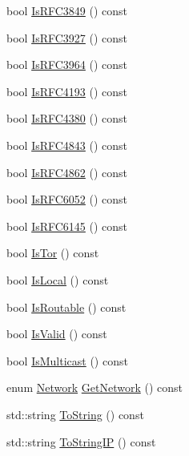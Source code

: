 \begin{DoxyCompactItemize}
\item 
bool \mbox{\hyperlink{class_c_net_addr_a7bf8bc283323c0cd9be42f921469c90f}{Is\+R\+F\+C3849}} () const
\item 
bool \mbox{\hyperlink{class_c_net_addr_af75408b0ae05d1e7d3931b80b65a70c4}{Is\+R\+F\+C3927}} () const
\item 
bool \mbox{\hyperlink{class_c_net_addr_ae0fcf758a607567f06cb966426289cd6}{Is\+R\+F\+C3964}} () const
\item 
bool \mbox{\hyperlink{class_c_net_addr_ac2eb12a3f11d9f54fa7c5072bf065d1c}{Is\+R\+F\+C4193}} () const
\item 
bool \mbox{\hyperlink{class_c_net_addr_aec91b10228b37eb9bd67dec322730492}{Is\+R\+F\+C4380}} () const
\item 
bool \mbox{\hyperlink{class_c_net_addr_af9286890842869ccc5f6fb82ce316ede}{Is\+R\+F\+C4843}} () const
\item 
bool \mbox{\hyperlink{class_c_net_addr_af8e0bb6b81be814e528143471b2fb482}{Is\+R\+F\+C4862}} () const
\item 
bool \mbox{\hyperlink{class_c_net_addr_a15b47f1fa3ded708f0e02e842482ee60}{Is\+R\+F\+C6052}} () const
\item 
bool \mbox{\hyperlink{class_c_net_addr_ad134823c7f268f29653d135d33f879aa}{Is\+R\+F\+C6145}} () const
\item 
bool \mbox{\hyperlink{class_c_net_addr_a4db37b4997ff3b8c57959f2aa915a9a3}{Is\+Tor}} () const
\item 
bool \mbox{\hyperlink{class_c_net_addr_a857bfcf95814b7d6ef4db309c84f179d}{Is\+Local}} () const
\item 
bool \mbox{\hyperlink{class_c_net_addr_a4e3b2fea2a6151c76684b3812df4a5c3}{Is\+Routable}} () const
\item 
bool \mbox{\hyperlink{class_c_net_addr_a6fe20b8da9701ca5dc2af078e2e8ac25}{Is\+Valid}} () const
\item 
bool \mbox{\hyperlink{class_c_net_addr_aabd54a329f70953f7895b56bcd000473}{Is\+Multicast}} () const
\item 
enum \mbox{\hyperlink{netbase_8h_acc9a38c714afe79b5035cb36f560dac3}{Network}} \mbox{\hyperlink{class_c_net_addr_ad0162f2629f552a65acf934e1629c1db}{Get\+Network}} () const
\item 
std\+::string \mbox{\hyperlink{class_c_net_addr_a474ea3874554fe3b79f607fdef97c243}{To\+String}} () const
\item 
std\+::string \mbox{\hyperlink{class_c_net_addr_a0c8d9b5ed3824546ff4dccca3b28b073}{To\+String\+IP}} () const
\item 

\end{DoxyCompactItemize}
